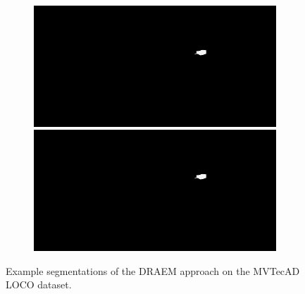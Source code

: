 \begin{figure}[H]
\begin{subfigure}[b]{\textwidth}
\begin{minipage}{0.45\textwidth}
            \includegraphics[width=\textwidth]{figures/appendix/appendix_DRAEM/SC/237m.png}
            \includegraphics[width=\textwidth]{figures/appendix/appendix_DRAEM/SC/237m.png}
        \end{minipage}
    \end{subfigure}


    \caption{Example segmentations of the DRAEM \cite{Zavrtanik_2021DRAEM} approach on the MVTecAD LOCO \cite{LOCODentsAndScratchesBergmann2022} dataset.}
    \label{fig:appendixDRAEM}
\end{figure}